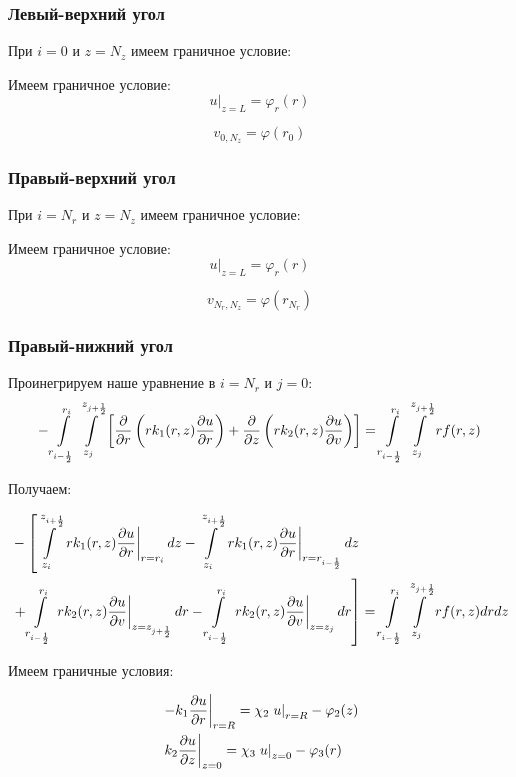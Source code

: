\subsubsection{Левый-верхний угол}

При $ i = 0 $ и $ z = N_z $ имеем граничное условие:

Имеем граничное условие:
\[
  \left . u \right \vert_{z=L} = \varphi_r(r) 
\]

\[
  v_{0,N_z} = \varphi(r_0)
\]

\subsubsection{Правый-верхний угол}

При $ i = N_r $ и $ z = N_z $ имеем граничное условие:

Имеем граничное условие:
\[
  \left . u \right \vert_{z=L} = \varphi_r(r) 
\]

\[
  v_{N_r,N_z} = \varphi(r_{N_r})
\]

\subsubsection{Правый-нижний угол}

Проинегрируем наше уравнение в $i = N_r$ и $ j = 0$:
\[
  - \int\limits^{r_{i }}_{r_{i -\frac{1}{2}}} \int\limits^{z_{j +\frac{1}{2}}}_{z_{j }} \left [ \pdv{}{r} \left ( r k_1(r, z) \pdv{u}{r} \right ) 
  + \pdv{}{z} \left ( rk_2(r, z)\pdv{u}{v} \right ) \right ] = \int\limits^{r_{i }}_{r_{i -\frac{1}{2}}} \int\limits^{z_{j +\frac{1}{2}}}_{z_{j }} rf(r, z)
\]

Получаем:

\begin{align*}
  &- \left [
   \int\limits^{z_{i+\frac{1}{2}}}_{z_{i}}  \left . r k_1(r, z) \pdv{u}{r} \right \vert_{r = r_i} dz
  - \int\limits^{z_{i+\frac{1}{2}}}_{z_{i}} \left . r k_1(r, z) \pdv{u}{r} \right \vert_{r = r_{i - \frac{1}{2}}} dz
  \right . \\
  &\left . + \int\limits^{r_{i}}_{r_{i-\frac{1}{2}}} \left . rk_2(r, z)\pdv{u}{v} \right \vert_{z = z_{j + \frac{1}{2}}} dr
  - \int\limits^{r_{i}}_{r_{i-\frac{1}{2}}} \left . rk_2(r, z)\pdv{u}{v} \right \vert_{z = z_{j}} dr
  \right ] = \int\limits^{r_{i }}_{r_{i -\frac{1}{2}}} \int\limits^{z_{j +\frac{1}{2}}}_{z_{j }} rf(r, z) dr dz
\end{align*}

Имеем граничные условия:

\begin{align*}
  &\left . -k_1 \pdv{u}{r} \right \vert_{r=R} = \chi_2 \left . u \right \vert_{r=R} - \varphi_2(z) \\
  &\left . k_2 \pdv{u}{z} \right \vert_{z=0} = \chi_3 \left . u \right \vert_{z=0} - \varphi_3(r) 
\end{align*}

